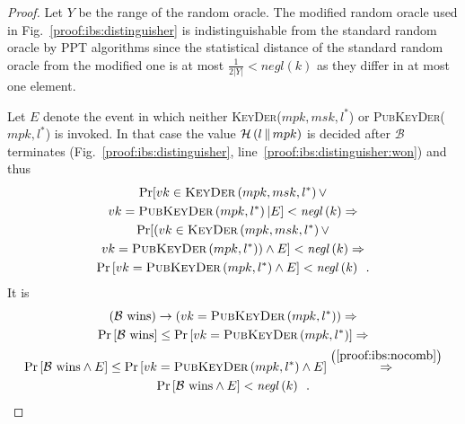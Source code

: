 \begin{proof}
      Let $Y$ be the range of the random oracle. The modified random oracle used
      in Fig.~\ref{proof:ibs:distinguisher} is indistinguishable from the
      standard random oracle by PPT algorithms since the statistical distance of
      the standard random oracle from the modified one is at most
      $\frac{1}{2|Y|} < \mathit{negl}\left(k\right)$ as they differ in at most
      one element.

      Let $E$ denote the event in which neither \textsc{KeyDer}($mpk, msk, l^*$)
      or \textsc{PubKeyDer}($mpk, l^*$) is invoked. In that case the value
      $\mathcal{H}\left(l \,\|\, mpk\right)$ is decided after $\mathcal{B}$
      terminates (Fig.~\ref{proof:ibs:distinguisher},
      line~\ref{proof:ibs:distinguisher:won}) and thus
      \begin{equation}
        \begin{gathered}
          \Pr[vk \in \textsc{KeyDer}\left(mpk, msk, l^*\right) \vee \\
          vk = \textsc{PubKeyDer}\left(mpk, l^*\right) | E] <
          \mathit{negl}\left(k\right) \Rightarrow \\
          \Pr[(vk \in \textsc{KeyDer}\left(mpk, msk, l^*\right) \vee \\
          vk = \textsc{PubKeyDer}\left(mpk, l^*\right)) \wedge E] <
          \mathit{negl}\left(k\right) \Rightarrow \\
          \Pr\left[vk = \textsc{PubKeyDer}\left(mpk, l^*\right) \wedge E\right]
          < \mathit{negl}\left(k\right) \enspace.
        \end{gathered}
        \label{proof:ibs:nocomb}
      \end{equation}
      It is
      \begin{gather*}
        \left(\mathcal{B} \text{ wins}\right) \rightarrow \left(vk =
        \textsc{PubKeyDer}\left(mpk, l^*\right)\right) \Rightarrow \\
        \Pr\left[\mathcal{B} \text{ wins}\right] \leq \Pr\left[vk =
        \textsc{PubKeyDer}\left(mpk, l^*\right)\right] \Rightarrow \\
        \Pr\left[\mathcal{B} \text{ wins} \wedge E\right] \leq \Pr\left[vk =
        \textsc{PubKeyDer}\left(mpk, l^*\right) \wedge E\right]
        \overset{\left(\ref{proof:ibs:nocomb}\right)}{\Rightarrow} \\
        \Pr\left[\mathcal{B} \text{ wins} \wedge E\right] <
        \mathit{negl}\left(k\right) \enspace.
      \end{gather*}


\end{proof}
